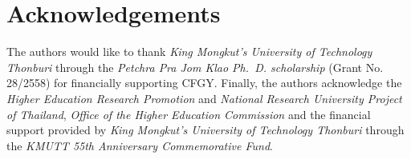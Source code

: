 

\section*{Acknowledgements}

The authors would like to thank
\emph{King Mongkut’s University of Technology Thonburi} through the
\emph{Petchra Pra Jom Klao Ph.~D. scholarship} (Grant No. 28/2558)
for financially supporting {CFGY}.
%
Finally, the authors acknowledge 
the \emph{Higher Education Research	Promotion} and \emph{National Research University Project of Thailand}, \emph{Office of the Higher Education Commission} 
and the financial support provided by \emph{King Mongkut's University of Technology Thonburi} through the \emph{KMUTT 55th Anniversary Commemorative Fund}.
